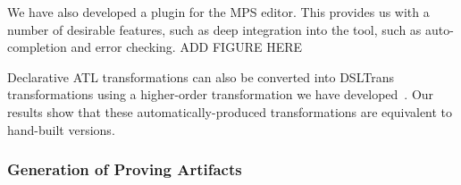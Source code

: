 We have also developed a plugin for the MPS editor. This provides us with a number of desirable features, such as deep integration into the tool, such as auto-completion and error checking. ADD FIGURE HERE

Declarative ATL transformations can also be converted into DSLTrans transformations using a higher-order transformation we have developed~\cite{Oakes2016}. Our results show that these automatically-produced transformations are equivalent to hand-built versions.

%
%


\subsubsection{Generation of Proving Artifacts}

